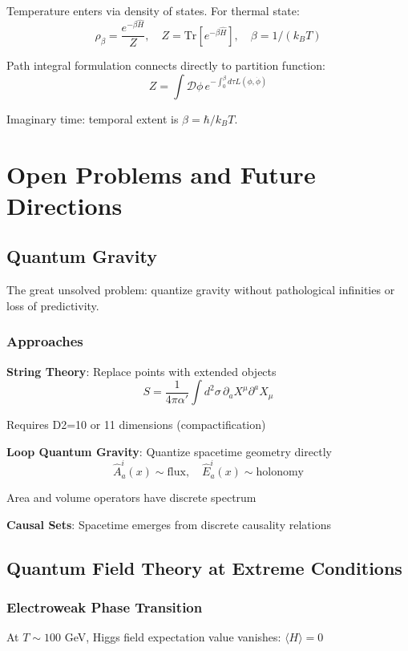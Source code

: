 \documentclass[12pt,openany,oneside]{book}
\begin{document}
{{{{Temperature enters via density of states. For thermal state:
\[
\rho_\beta = \frac{e^{-\beta\hat{H}}}{Z}, \quad Z = \text{Tr}[e^{-\beta\hat{H}}], \quad \beta = 1/(k_B T)
\]

Path integral formulation connects directly to partition function:
\[
Z = \int \mathcal{D}\phi \, e^{-\int_0^\beta d\tau L(\phi, \dot{\phi})}
\]

Imaginary time: temporal extent is $\beta = \hbar/k_B T$.

\chapter{Open Problems and Future Directions}

\section{Quantum Gravity}

The great unsolved problem: quantize gravity without pathological infinities or loss of predictivity.

\subsection{Approaches}

\textbf{String Theory}: Replace points with extended objects
\[
S = \frac{1}{4\pi\alpha'}\int d^2\sigma \, \partial_a X^\mu \partial^a X_\mu
\]

Requires D2=10 or 11 dimensions (compactification)

\textbf{Loop Quantum Gravity}: Quantize spacetime geometry directly
\[
\hat{A}^i_a(x) \sim \text{flux}, \quad \hat{E}^i_a(x) \sim \text{holonomy}
\]

Area and volume operators have discrete spectrum

\textbf{Causal Sets}: Spacetime emerges from discrete causality relations

\section{Quantum Field Theory at Extreme Conditions}

\subsection{Electroweak Phase Transition}

At $T \sim 100$ GeV, Higgs field expectation value vanishes: $\langle H \rangle = 0$

}}}}
\end{document}
